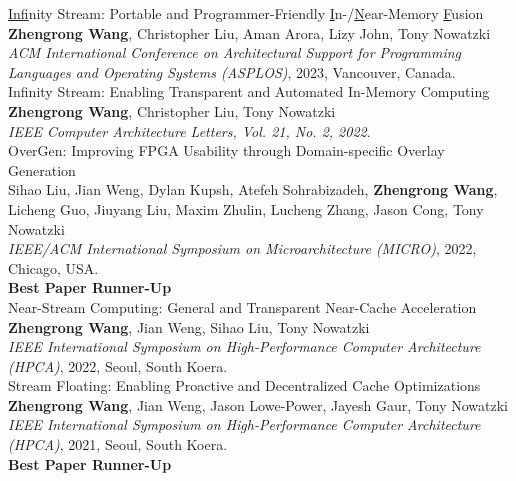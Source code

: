\documentclass[a4paper]{article}
\newenvironment{changemargin}[2]{%
  \begin{list}{}{%
    \setlength{\topsep}{0pt}%
    \setlength{\leftmargin}{#1}%
    \setlength{\rightmargin}{#2}%
    \setlength{\listparindent}{\parindent}%
    \setlength{\itemindent}{\parindent}%
    \setlength{\parsep}{\parskip}%
  }%
  \item[]}{\end{list}
}
\newenvironment{body} {
	\vspace*{-16pt}
	\begin{changemargin}{-0.5in}{-0.5in}
  }	
	{\end{changemargin}
}
\begin{document}
\begin{body}
	\vspace{14pt}
    \underline{Inf}inity Stream: Portable and Programmer-Friendly \underline{I}n-/\underline{N}ear-Memory \underline{F}usion \\
	\textbf{Zhengrong Wang}, Christopher Liu, Aman Arora, Lizy John, Tony Nowatzki \\
	\emph{ACM International Conference on Architectural Support for Programming Languages and Operating Systems (ASPLOS)}, 2023, Vancouver, Canada.\\
	\vspace{6pt}
    Infinity Stream: Enabling Transparent and Automated In-Memory Computing \\
	\textbf{Zhengrong Wang}, Christopher Liu, Tony Nowatzki \\
    \emph{IEEE Computer Architecture Letters, Vol. 21, No. 2, 2022}.\\
	\vspace{6pt}
	OverGen: Improving FPGA Usability through Domain-specific Overlay Generation\\
	Sihao Liu, Jian Weng, Dylan Kupsh, Atefeh Sohrabizadeh, \textbf{Zhengrong Wang}, Licheng Guo, Jiuyang Liu, Maxim Zhulin, Lucheng Zhang, Jason Cong, Tony Nowatzki \\
	\emph{IEEE/ACM International Symposium on Microarchitecture (MICRO)}, 2022, Chicago, USA.\\
	\textbf{Best Paper Runner-Up} \\
	\vspace{6pt}
	Near-Stream Computing: General and Transparent Near-Cache Acceleration \\
	\textbf{Zhengrong Wang}, Jian Weng, Sihao Liu, Tony Nowatzki \\
	\emph{IEEE International Symposium on High-Performance Computer Architecture (HPCA)}, 2022, Seoul, South Koera.\\
	\vspace{6pt}
	Stream Floating: Enabling Proactive and Decentralized Cache Optimizations \\
	\textbf{Zhengrong Wang}, Jian Weng, Jason Lowe-Power, Jayesh Gaur, Tony Nowatzki \\
	\emph{IEEE International Symposium on High-Performance Computer Architecture (HPCA)}, 2021, Seoul, South Koera.\\
	\textbf{Best Paper Runner-Up} \\
	\vspace{6pt}

\end{body}
\end{document}
